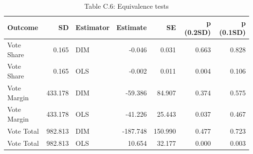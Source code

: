 \begin{table}[!h]
\centering
\caption{Table C.6: Equivalence tests}
\centering
\begin{tabular}[t]{lrlrrrr}
\toprule
Outcome & SD & Estimator & Estimate & SE & p (0.2SD) & p (0.1SD)\\
\midrule
Vote Share & 0.165 & DIM & -0.046 & 0.031 & 0.663 & 0.828\\
Vote Share & 0.165 & OLS & -0.002 & 0.011 & 0.004 & 0.106\\
Vote Margin & 433.178 & DIM & -59.386 & 84.907 & 0.374 & 0.575\\
Vote Margin & 433.178 & OLS & -41.226 & 25.443 & 0.037 & 0.467\\
Vote Total & 982.813 & DIM & -187.748 & 150.990 & 0.477 & 0.723\\
\addlinespace
Vote Total & 982.813 & OLS & 10.654 & 32.177 & 0.000 & 0.003\\
\bottomrule
\end{tabular}
\end{table}
